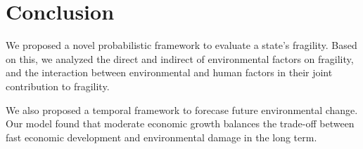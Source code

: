 \section{Conclusion}
\label{sec:conclusion}

We proposed a novel probabilistic framework to evaluate a state's fragility. Based on this, we analyzed the direct and indirect of environmental factors on fragility, and the interaction between environmental and human factors in their joint contribution to fragility. 

We also proposed a temporal framework to forecase future environmental change. Our model found that moderate economic growth balances the trade-off between fast economic development and environmental damage in the long term.